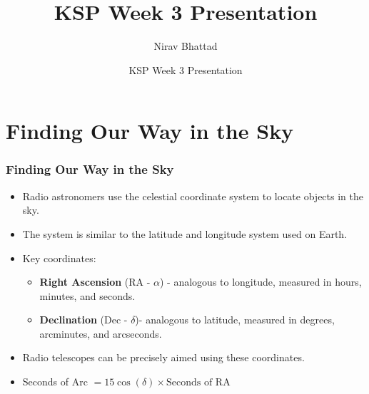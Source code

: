 \documentclass[handout, %
	11pt, %
]{beamer}
\title[KSP Week 3 Presentation]{KSP Week 3 Presentation} %
\author[Nirav]{Nirav Bhattad} %
\date[\today]{KSP Week 3 Presentation} %
\begin{document}

\begin{frame}
	\titlepage %
\end{frame}


\section{Finding Our Way in the Sky}
\begin{frame}
    \frametitle{Finding Our Way in the Sky}
    \begin{itemize}
        \item Radio astronomers use the celestial coordinate system to locate objects in the sky.
        \item The system is similar to the latitude and longitude system used on Earth.
        \item Key coordinates:
            \begin{itemize}
                \item \textbf{Right Ascension} (RA - $\alpha$) - analogous to longitude, measured in hours, minutes, and seconds.
                \item \textbf{Declination} (Dec - $\delta$)- analogous to latitude, measured in degrees, arcminutes, and arcseconds.
            \end{itemize}
        \item Radio telescopes can be precisely aimed using these coordinates.
        \item Seconds of Arc $ = 15 \cos (\delta) \times \text{Seconds of RA}$
    \end{itemize}
\end{frame}
\end{document}
